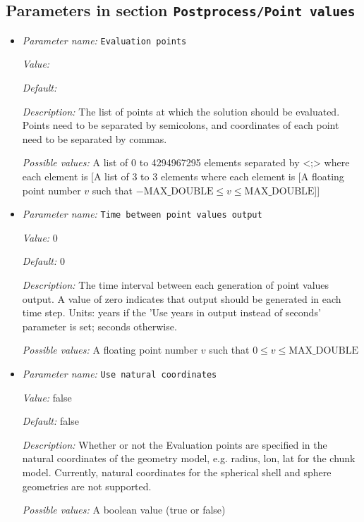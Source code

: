 \subsection{Parameters in section \tt Postprocess/Point values}
\label{parameters:Postprocess/Point_20values}

\begin{itemize}
\item {\it Parameter name:} {\tt Evaluation points}
\label{parameters:Postprocess/Point values/Evaluation points}
\label{parameters:Postprocess/Point_20values/Evaluation_20points}


{\it Value:} 


{\it Default:} 


{\it Description:} The list of points at which the solution should be evaluated. Points need to be separated by semicolons, and coordinates of each point need to be separated by commas.


{\it Possible values:} A list of 0 to 4294967295 elements separated by <;> where each element is [A list of 3 to 3 elements where each element is [A floating point number $v$ such that $-\text{MAX\_DOUBLE} \leq v \leq \text{MAX\_DOUBLE}$]]
\item {\it Parameter name:} {\tt Time between point values output}
\label{parameters:Postprocess/Point values/Time between point values output}
\label{parameters:Postprocess/Point_20values/Time_20between_20point_20values_20output}


{\it Value:} 0


{\it Default:} 0


{\it Description:} The time interval between each generation of point values output. A value of zero indicates that output should be generated in each time step. Units: years if the 'Use years in output instead of seconds' parameter is set; seconds otherwise.


{\it Possible values:} A floating point number $v$ such that $0 \leq v \leq \text{MAX\_DOUBLE}$
\item {\it Parameter name:} {\tt Use natural coordinates}
\label{parameters:Postprocess/Point values/Use natural coordinates}
\label{parameters:Postprocess/Point_20values/Use_20natural_20coordinates}


{\it Value:} false


{\it Default:} false


{\it Description:} Whether or not the Evaluation points are specified in the natural coordinates of the geometry model, e.g. radius, lon, lat for the chunk model. Currently, natural coordinates for the spherical shell and sphere geometries are not supported. 


{\it Possible values:} A boolean value (true or false)
\end{itemize}

